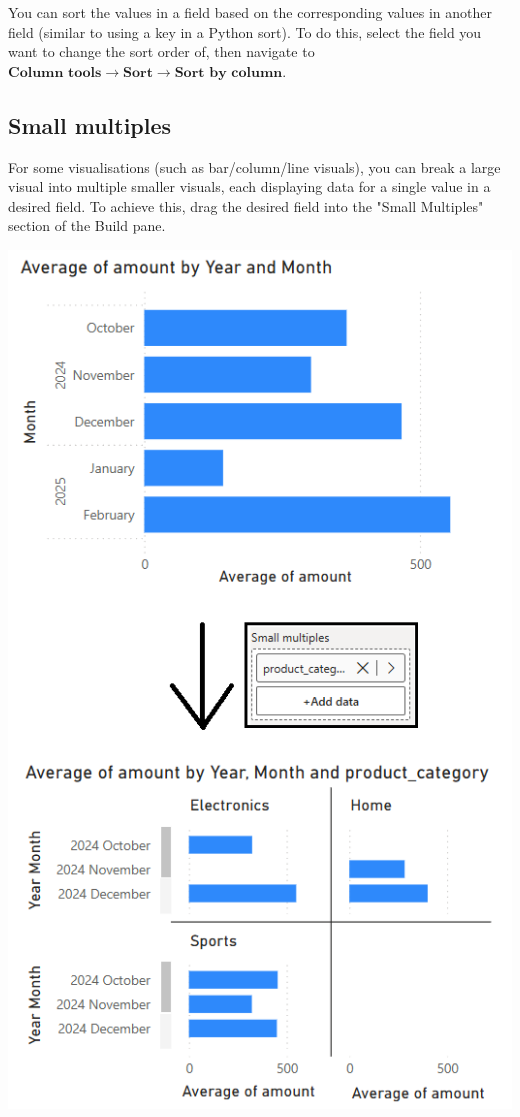 \documentclass[10pt, openany, twocolumn]{book}
\begin{document}
You can sort the values in a field based on the corresponding values in another field (similar to using a key in a Python sort). To do this, select the field you want to change the sort order of, then navigate to $\textbf{Column tools} \rightarrow \textbf{Sort} \rightarrow \textbf{Sort by column}$.

\subsection*{Small multiples}

For some visualisations (such as bar/column/line visuals), you can break a large visual into multiple smaller visuals, each displaying data for a single value in a desired field. To achieve this, drag the desired field into the "Small Multiples" section of the Build pane. 
\begin{center}
    \includegraphics[width=0.86\columnwidth]{images/small_multiples.png}
\end{center}
\end{document}

